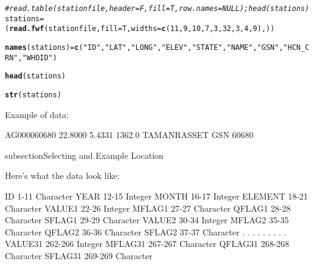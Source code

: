 \documentclass{article}\usepackage[]{graphicx}\usepackage[]{color}
\makeatletter
\newcommand{\hlnum}[1]{\textcolor[rgb]{0.686,0.059,0.569}{#1}}%
\newcommand{\hlstr}[1]{\textcolor[rgb]{0.192,0.494,0.8}{#1}}%
\newcommand{\hlcom}[1]{\textcolor[rgb]{0.678,0.584,0.686}{\textit{#1}}}%
\newcommand{\hlstd}[1]{\textcolor[rgb]{0.345,0.345,0.345}{#1}}%
\newcommand{\hlkwb}[1]{\textcolor[rgb]{0.69,0.353,0.396}{#1}}%
\newcommand{\hlkwc}[1]{\textcolor[rgb]{0.333,0.667,0.333}{#1}}%
\newcommand{\hlkwd}[1]{\textcolor[rgb]{0.737,0.353,0.396}{\textbf{#1}}}%
\newenvironment{kframe}{%
 \def\at@end@of@kframe{}%
 \ifinner\ifhmode%
  \def\at@end@of@kframe{\end{minipage}}%
  \begin{minipage}{\columnwidth}%
 \fi\fi%
 \def\FrameCommand##1{\hskip\@totalleftmargin \hskip-\fboxsep
 \colorbox{shadecolor}{##1}\hskip-\fboxsep
     \hskip-\linewidth \hskip-\@totalleftmargin \hskip\columnwidth}%
 \MakeFramed {\advance\hsize-\width
   \@totalleftmargin\z@ \linewidth\hsize
   \@setminipage}}%
 {\par\unskip\endMakeFramed%
 \at@end@of@kframe}
\newenvironment{knitrout}{}{} %
\makeatother
\begin{document}
\begin{knitrout}
\color{fgcolor}\begin{kframe}
\begin{alltt}
\hlcom{# read.table(stationfile, header=F, fill=T, row.names=NULL); head(stations)}
\hlstd{stations} \hlkwb{=} \hlstd{(}\hlkwd{read.fwf}\hlstd{(stationfile,} \hlkwc{fill}\hlstd{=T,} \hlkwc{widths}\hlstd{=} \hlkwd{c}\hlstd{(}\hlnum{11}\hlstd{,} \hlnum{9}\hlstd{,} \hlnum{10}\hlstd{,} \hlnum{7}\hlstd{,} \hlnum{3}\hlstd{,} \hlnum{32}\hlstd{,} \hlnum{3}\hlstd{,} \hlnum{4}\hlstd{,} \hlnum{9}\hlstd{), ))}
\end{alltt}


{\ttfamily\noindent\bfseries\color{errorcolor}{\#\# Error in read.fwf(stationfile, fill = T, widths = c(11, 9, 10, 7, 3, 32, : object 'stationfile' not found}}\begin{alltt}
\hlkwd{names}\hlstd{(stations)}\hlkwb{=} \hlkwd{c}\hlstd{(}\hlstr{"ID"}\hlstd{,} \hlstr{"LAT"}\hlstd{,} \hlstr{"LONG"}\hlstd{,} \hlstr{"ELEV"}\hlstd{,} \hlstr{"STATE"}\hlstd{,} \hlstr{"NAME"}\hlstd{,} \hlstr{"GSN"}\hlstd{,} \hlstr{"HCN_CRN"}\hlstd{,} \hlstr{"WHOID"}\hlstd{)}
\end{alltt}


{\ttfamily\noindent\bfseries{}}\begin{alltt}
\hlkwd{head}\hlstd{(stations)}
\end{alltt}


{\ttfamily\noindent\bfseries\color{errorcolor}{\#\# Error in head(stations): object 'stations' not found}}\begin{alltt}
\hlkwd{str}\hlstd{(stations)}
\end{alltt}


{\ttfamily\noindent\bfseries\color{errorcolor}{\#\# Error in str(stations): object 'stations' not found}}\end{kframe}
\end{knitrout}

Example of data:

AG000060680  22.8000    5.4331 1362.0    TAMANRASSET                    GSN     60680        
         

subsection{Selecting and Example Location}

Here's what the data look like:

ID            1-11   Character
YEAR         12-15   Integer
MONTH        16-17   Integer
ELEMENT      18-21   Character
VALUE1       22-26   Integer
MFLAG1       27-27   Character
QFLAG1       28-28   Character
SFLAG1       29-29   Character
VALUE2       30-34   Integer
MFLAG2       35-35   Character
QFLAG2       36-36   Character
SFLAG2       37-37   Character
  .           .          .
  .           .          .
  .           .          .
VALUE31    262-266   Integer
MFLAG31    267-267   Character
QFLAG31    268-268   Character
SFLAG31    269-269   Character
\end{document}
